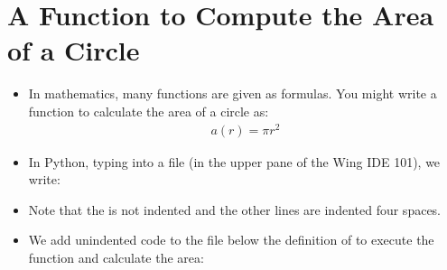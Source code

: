 \documentclass[letterpaper,10pt,english]{sphinxmanual}
\begin{document}
\section{A Function to Compute the Area of a Circle}
\label{\detokenize{lecture_notes/lec05_functions2:a-function-to-compute-the-area-of-a-circle}}\begin{itemize}
\item {} 
In mathematics, many functions are given as formulas. You might
write a function to calculate the area of a circle as:
\begin{equation*}
\begin{split}a(r) = \pi r^2\end{split}
\end{equation*}
\item {} 
In Python, typing into a file (in the upper pane of the Wing IDE 101),
we write:

\begin{sphinxVerbatim}[commandchars=\\\{\}]
 
      
        
     
\end{sphinxVerbatim}

\item {} 
Note that the  is not indented and the other lines are
indented four spaces.

\item {} 
We add unindented code to the file below the definition of
 to execute the function and calculate
the area:

\begin{sphinxVerbatim}[commandchars=\\\{\}]
  
  
  
 
\end{sphinxVerbatim}


\end{itemize}
\end{document}
